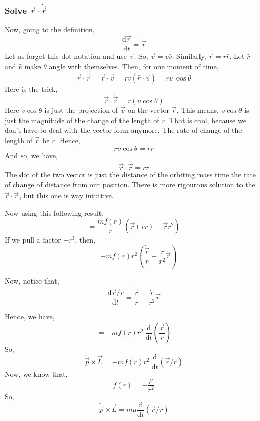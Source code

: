 \documentclass[11pt,a4paper]{article}
\begin{document}
\subsubsection{ Solve $\vec{r}\cdot \dot{\vec{r}}$ }
Now, going to the definition,
\[ 
\frac{\mathrm{d} \vec{r}}{\mathrm{d} t} = \dot{\vec{r}}
\]
Let us forget this dot notation and use $\vec{v}$. So, $\vec{v}= v \hat{v}$. Similarly,
$\vec{r} = r \hat{r}$. Let $\hat{r} $ and $\hat{v}$ make $\theta$ angle with themselves.
Then, for one moment of time,
\[ 
    \vec{r}\cdot \dot{\vec{r}} = \vec{r} \cdot \vec{v} = r v \left( \hat{r} \cdot \vec{v} \right) = r v \ \cos \theta
\]
Here is the trick,
\[ 
    \vec{r} \cdot  \dot{ \vec{r}} = r \left( v \cos  \theta\right) 
\]
Here $v \cos \theta $ is just the projection of $\vec{v}$ on the vector $\vec{r}$. This means, $v \cos \theta$ is just the magnitude of the change of the length of $r$. That is cool, because we don't have to deal with the vector form anymore. The rate of change of the length of $\vec{r}$ be $ \dot{r}$. Hence, 
\[ 
r v \cos \theta = r \dot{r}
\]
And so, we have,
\[ 
\vec{r} \cdot  \dot{\vec{r}} = r \dot{r}
\]
The dot of the two vector is just the distance of the orbiting mass time the rate of change of distance from our position. There is more rigourous solution to the $\vec{r} \cdot  \dot{\vec{r}}$, but this one is way intuitive.

Now using this following result,
\[ 
    = \frac{m f(r)}{r} \left( 
        \vec{r} \left( r \dot{r} \right) - 
        \dot{\vec{r}} r^2
    \right) 
\]
If we pull a factor $-r^3$, then,
\[ 
    = - m f(r) r^2 \left( \frac{ \dot{\vec{r}}}{r} - \frac{ \dot{r}}{r^2} \vec{r} \right)  
\]

Now, notice that,
\[ 
\frac{\mathrm{d} \vec{r}/r}{\mathrm{d} t} = \frac{ \dot{\vec{r}}}{r} - \frac{ \dot{r}}{r^2} \vec{r}
\]

Hence, we have,
\[ 
    = - m f(r) r^2 \ \frac{\mathrm{d} }{\mathrm{d} t}\left( \frac{\vec{r}}{r} \right) 
\]
So,
\[ 
    \dot{\vec{p}} \times  \vec{L} = - m f(r) r^2 \ \frac{\mathrm{d} }{\mathrm{d} t} \left( \vec{r}/r \right) 
\]
Now, we know that,
\[ 
    f(r) = - \frac{\mu}{r^2}
\]
So,
\[ 
    \dot{\vec{p}} \times  \vec{L} = m \mu \frac{\mathrm{d} }{\mathrm{d} t} \left( \vec{r}/r \right) 
\]
\end{document}
